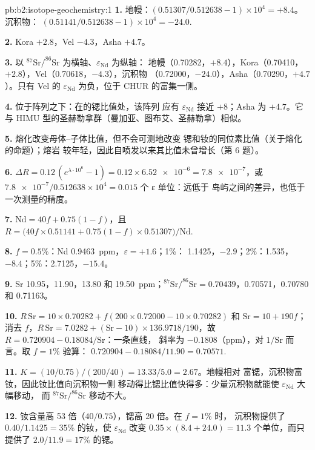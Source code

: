\begin{solution}{pb:b2:isotope-geochemistry:1}
\textbf{1.} 地幔：$(0.51307/0.512638 - 1)\times10^4 = +8.4$。沉积物：
$(0.51141/0.512638 - 1)\times10^4 = -24.0$.

\textbf{2.} Kora $+2.8$，Vel $-4.3$，Asha $+4.7$。

\textbf{3.} 以 $^{87}\mathrm{Sr}/^{86}\mathrm{Sr}$ 为横轴、$\varepsilon_{\mathrm{Nd}}$ 为纵轴：
地幔（0.70282，$+8.4$），Kora（0.70410，$+2.8$），Vel（0.70618，$-4.3$），沉积物
（0.72000，$-24.0$），Asha（0.70290，$+4.7$）。只有 Vel
的 $\varepsilon_{\mathrm{Nd}}$ 为负，位于 CHUR 的富集一侧。

\textbf{4.} 位于阵列之下：在的锶比值处，该阵列
应有 $\varepsilon_{\mathrm{Nd}}$ 接近 $+8$；Asha 为 $+4.7$。它与
HIMU 型的圣赫勒拿群（曼加亚、图布艾、圣赫勒拿）相似。

\textbf{5.} 熔化改变母体–子体比值，但不会可测地改变
锶和钕的同位素比值（关于熔化的命题）；熔岩
较年轻，因此自喷发以来其比值未曾增长（第 6 题）。

\textbf{6.} $\Delta R = 0.12\,(e^{\lambda\cdot10^6} - 1) = 0.12\times\num{6.52e-6} =
\num{7.8e-7}$，或 $\num{7.8e-7}/0.512638\times10^4 = 0.015$ 个 ε 单位：远低于
岛屿之间的差异，也低于一次测量的精度。

\textbf{7.} $\mathrm{Nd} = 40f + 0.75(1-f)$，且
$R = \bigl(40f\times0.51141 + 0.75(1-f)\times0.51307\bigr)/\mathrm{Nd}$.

\textbf{8.} $f = 0.5$\%：Nd \qty{0.9463}{ppm}，$\varepsilon = +1.6$；1\%：
1.1425，$-2.9$；2\%：1.535，$-8.4$；5\%：2.7125，$-15.4$。

\textbf{9.} Sr 10.95，11.90，13.80 和 \qty{19.50}{ppm}；$^{87}\mathrm{Sr}/^{86}\mathrm{Sr} =
0.70439$，0.70571，0.70780 和 0.71163。

\textbf{10.} $R\,\mathrm{Sr} = 10\times0.70282 + f(200\times0.72000 - 10\times0.70282)$ 和
$\mathrm{Sr} = 10 + 190f$；消去 $f$，$R\,\mathrm{Sr} = 7.0282 +
(\mathrm{Sr}-10)\times136.9718/190$，故 $R = 0.720904 - 0.18084/\mathrm{Sr}$：一条直线，
斜率为 $-0.1808$（ppm），对 $1/\mathrm{Sr}$ 而言。取 $f = 1$\% 验算：
$0.720904 - 0.18084/11.90 = 0.70571$.

\textbf{11.} $K = (10/0.75)/(200/40) = 13.33/5.0 = 2.67$。地幔相对
富锶，沉积物富钕，因此钕比值向沉积物一侧
移动得比锶比值快得多：少量沉积物就能使 $\varepsilon_{\mathrm{Nd}}$ 大幅移动，
而 $^{87}\mathrm{Sr}/^{86}\mathrm{Sr}$ 移动不大。

\textbf{12.} 钕含量高 53 倍（$40/0.75$），锶高 20 倍。在 $f = 1$\% 时，
沉积物提供了 $0.40/1.1425 = 35$\% 的钕，使
$\varepsilon_{\mathrm{Nd}}$ 改变 $0.35\times(8.4 + 24.0) = 11.3$ 个单位，而只提供了 $2.0/11.9 =
17$\% 的锶。


\end{solution}
